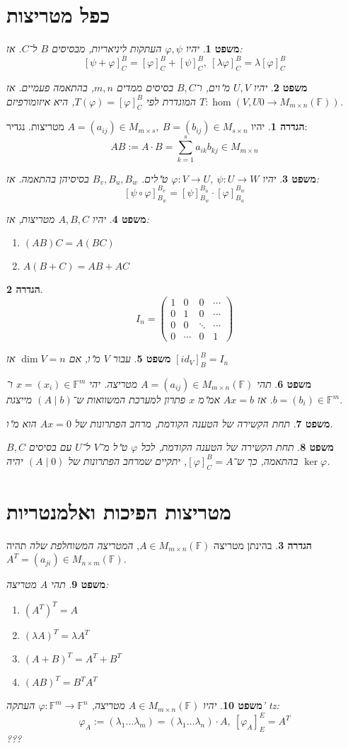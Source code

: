 \documentclass[]{article}
\newcommand\F         {\mathbb{F}}
\newcommand\co        {\colon}
\newcommand\pms[1]    {\begin{pmatrix}
		#1
\end{pmatrix}}
\renewcommand\lg      {\lambda}
\renewcommand\phi     {\varphi}
\newtheorem{Theorem}{משפט}
\theoremstyle{definition}
\newtheorem{definition}{הגדרה}
\newcommand\theo  [1] {\begin{Theorem}#1\end{Theorem}}
\newcommand\defi  [1] {\begin{definition}#1\end{definition}}
\begin{document}
\begin{multicols}{2}
		\section{כפל מטריצות}
		\theo{יהיו $\phi, \psi$ העתקות ליניאריות, מבסיסים $B$ ל־$C$. אז: 
			\[ [\psi + \phi]_C^B = [\phi]_C^B + [\psi]_C^B, \ [\lg\phi]_C^B = \lg[\phi]_C^B \]}
		\theo{יהיו $U, V$ מ"וים, ו־$B, C$ בסיסים ממדים $m, n$, בהתאמה פעמיים. אז $T \co \hom(V, U0 \to M_{m \times n}(\F))$ המוגדרת לפי $T(\phi) = [\phi]_C^B$, היא איזומורפיזם. }
		\defi{יהיו $A = (a_{ij}) \in M_{m \times s}, \ B = (b_{ij}) \in M_{s \times n}$ מטריצות. נגדיר: 
		\[ AB := A \cdot B = \sum_{k = 1}^{s}a_{ik}b_{kj} \in M_{m \times n} \]}
		\theo{יהיו $\phi \co V \to U, \ \psi \co U \to W$ ט"לים. $B_v, B_u, B_w$ בסיסיהן בהתאמה. אז: 
		\[ [\psi \circ \phi]_{B_w}^{B_v} = [\psi]_{B_w}^{B_u} \cdot [\phi]_{B_u}^{B_w} \]}
		\theo{יהיו $A, B, C$ מטריצות, אז: 
		\begin{enumerate}
			\item \hfil $(AB)C = A(BC)$
			\item \hfil $A(B + C) = AB + AC$
		\end{enumerate}}
		\defi{
		\[ I_n = \pms{1 & 0 & 0 & \cdots \\ 0 & 1 & 0 & \cdots \\ 0 & 0 & \ddots & \cdots \\ 0 & \cdots & 0 & 1} \]}
		\theo{עבור $V$ מ"ו, אם $\dim V = n$ אז $[id_V]^B_B = I_n$}
		\theo{תהי $A = (a_{ij}) \in M_{m \times n}(\F)$ מטריצה. יהי $x = (x_i) \in \F^m$ ו־$b = (b_i) \in \F^m$. אז $Ax = b$ אמ"מ $x$ פתרון למערכת המשוואות ש־$(A \mid b)$ מייצגת. }
		\theo{תחת הקשירה של הטענה הקודמת, מרחב הפתרונות של $Ax = 0$ הוא מ"ו. }
		\theo{תחת הקשירה של הטענה הקודמת, לכל $\phi$ ט"ל מ־$V$ ל־$U$ עם בסיסים $B, C$ בהתאמה, כך ש־$[\phi]_C^B = A$, יתקיים שמרחב הפתרונות של $(A \mid 0)$ יהיה $\ker \phi$. }
		
		\section{מטריצות הפיכות ואלמנטריות}
		\defi{בהינתן מטריצה $A \in M_{m \times n}(\F)$, \textit{המטריצה המשוחלפת שלה} תהיה 
		$A^T = (a_{ji}) \in M_{n \times m}(\F)$. }
		\theo{תהי $A$ מטריצה: 
		\begin{enumerate}
			\item \hfil $(A^T)^T = A$
			\item \hfil $(\lg A)^T = \lg A^T$
			\item \hfil $(A + B)^T = A^T + B^T$
			\item \hfil $(AB)^T = B^TA^T$
		\end{enumerate}}
		\theo{יהיו $A \in M_{m \times n}(\F)$ מטריצה, $\phi \co \F^m \to \F^n$ העתקה' tz: 
		\[ \phi_A := (\lg_1 \dots \lg_m) = (\lg_1 \dots \lg_n) \cdot A, \ [\phi_A]^E_E = A^T \] ???}
		

\end{multicols}
\end{document}
